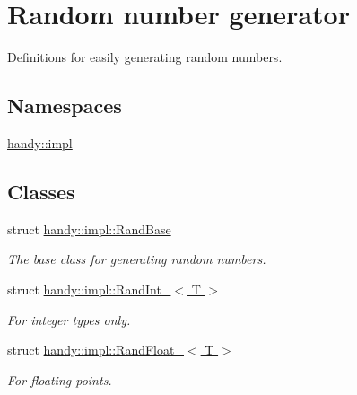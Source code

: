 \hypertarget{group__RandomGroup}{}\section{Random number generator}
\label{group__RandomGroup}


Definitions for easily generating random numbers.  


\subsection*{Namespaces}
\begin{DoxyCompactItemize}
\item 
 \hyperlink{namespacehandy_1_1impl}{handy\+::impl}
\end{DoxyCompactItemize}
\subsection*{Classes}
\begin{DoxyCompactItemize}
\item 
struct \hyperlink{structhandy_1_1impl_1_1RandBase}{handy\+::impl\+::\+Rand\+Base}
\begin{DoxyCompactList}\small\item\em The base class for generating random numbers. \end{DoxyCompactList}\item 
struct \hyperlink{structhandy_1_1impl_1_1RandInt__}{handy\+::impl\+::\+Rand\+Int\+\_\+$<$ T $>$}
\begin{DoxyCompactList}\small\item\em For integer types only. \end{DoxyCompactList}\item 
struct \hyperlink{structhandy_1_1impl_1_1RandFloat__}{handy\+::impl\+::\+Rand\+Float\+\_\+$<$ T $>$}
\begin{DoxyCompactList}\small\item\em For floating points. \end{DoxyCompactList}\end{DoxyCompactItemize}
